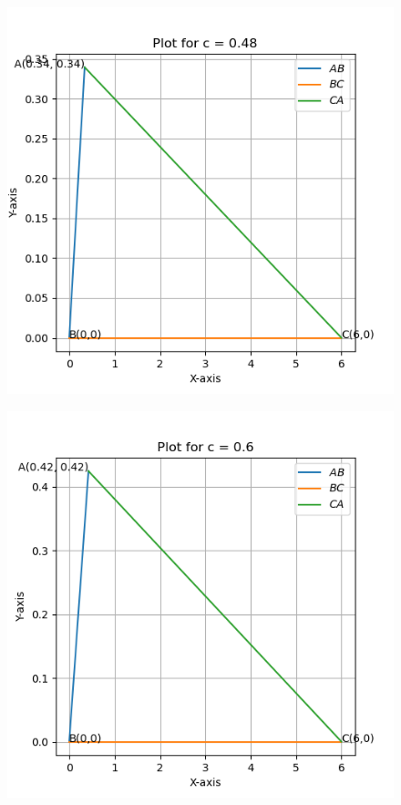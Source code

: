 \documentclass[journal]{IEEEtran}
\begin{document}
\begin{figure}[h]
	\centering
	\includegraphics[scale=0.6]{figs/plot_triangle_1.png}
	\label{Fig}
\end{figure}
\begin{figure}[h]
	\centering
	\includegraphics[scale=0.6]{figs/plot_triangle_2.png}
	\label{Fig}
\end{figure}
\end{document}
